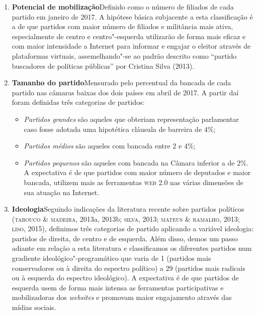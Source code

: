 \begin{enumerate}
\item\textbf{Potencial de mobilização}\quad Definido como o número de
filiados de cada partido em janeiro de 2017. A hipótese básica
subjacente a esta classificação é a de que partidos com maior número de
filiados e militância mais ativa, especialmente de centro e
centro"-esquerda utilizarão de forma mais eficaz e com maior intensidade
a Internet para informar e engajar o eleitor através de plataformas
virtuais, assemelhando"-se ao padrão descrito como ``partido buscadores
de políticas públicas'' por Cristina Silva (2013).

\item\textbf{Tamanho do partido}\quad Mensurado pelo percentual da
bancada de cada partido nas câmaras baixas dos dois países em abril de
2017. A partir daí foram definidas três categorias de partidos: 

\begin{itemize}
\item \textit{Partidos grandes} são aqueles que obteriam representação parlamentar
caso fosse adotada uma hipotética cláusula de barreira de 4\%; 

\item \textit{Partidos médios} são aqueles com bancada entre 2 e 4\%; 

\item \textit{Partidos pequenos} são aqueles com bancada na Câmara inferior a de
2\%. A expectativa é de que partidos com maior número de deputados e
maior bancada, utilizem mais as ferramentas \textsc{web 2.0} nas várias dimensões
de sua atuação na Internet.
\end{itemize}

\item\textbf{Ideologia}\quad Seguindo indicações da literatura
recente sobre partidos políticos (\textsc{tarouco \& madeira}, 2013a, 2013b;
\textsc{silva}, 2013; \textsc{mateus \& ramalho}, 2013; \textsc{liso}, 2015), definimos três
categorias de partido aplicando a variável ideologia: partidos de
direita, de centro e de esquerda. Além disso, demos um passo adiante em
relação a esta literatura e classificamos os diferentes partidos num
gradiente ideológico"-programático que varia de 1 (partidos mais
conservadores ou à direita do espectro político) a 29 (partidos mais
radicais ou à esquerda do espectro ideológico). A expectativa é de que
partidos de esquerda usem de forma mais intensa as ferramentas
participativas e mobilizadoras dos \textit{websites} e promovam maior engajamento
através das mídias sociais.


\end{enumerate}
